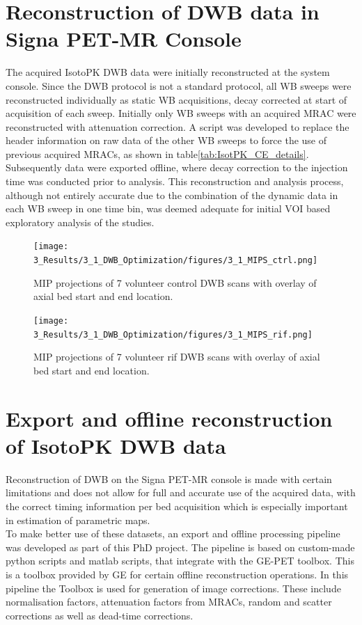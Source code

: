 \section{Reconstruction of DWB data in Signa PET-MR Console}
The acquired IsotoPK DWB data were initially reconstructed at the system console. Since the DWB protocol is not a standard protocol, all WB sweeps were reconstructed individually as static WB acquisitions, decay corrected at start of acquisition of each sweep. Initially only WB sweeps with an acquired MRAC were reconstructed with attenuation correction. A script was developed to replace the header information on raw data of the other WB sweeps to force the use of previous acquired MRACs, as shown in table\ref{tab:IsotPK_CE_details}. Subsequently data were exported offline, where decay correction to the injection time was conducted prior to analysis. This reconstruction and analysis process, although not entirely accurate due to the combination of the dynamic data in each WB sweep in one time bin, was deemed adequate for initial VOI based exploratory analysis of the studies.
%
%
\begin{figure} [ht!]
\centering
\texttt{[image: 3\_Results/3\_1\_DWB\_Optimization/figures/3\_1\_MIPS\_ctrl.png]}
\caption{MIP projections of 7 volunteer control DWB scans with overlay of axial bed start and end location.} 
\label{fig3_1:ctrl_mips}
\end{figure}
%
\begin{figure} [ht!]
\centering
\texttt{[image: 3\_Results/3\_1\_DWB\_Optimization/figures/3\_1\_MIPS\_rif.png]}
\caption{MIP projections of 7 volunteer rif DWB scans with overlay of axial bed start and end location.} 
\label{fig3_1:rif_mips}
\end{figure}
%
%
\section{Export and offline reconstruction of IsotoPK DWB data}
Reconstruction of DWB on the Signa PET-MR console is made with certain limitations and does not allow for full and accurate use of the acquired data, with the correct timing information per bed acquisition which is especially important in estimation of parametric maps. \\
To make better use of these datasets, an export and offline processing pipeline was developed as part of this PhD project. The pipeline is based on custom-made python scripts and matlab scripts, that integrate with the GE-PET toolbox. This is a toolbox provided by GE for certain offline reconstruction operations. In this pipeline the Toolbox is used for generation of image corrections. These include normalisation factors, attenuation factors from MRACs, random and scatter corrections as well as dead-time corrections. 

